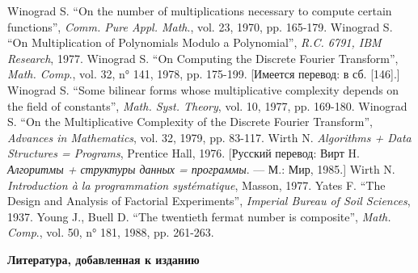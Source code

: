 \documentclass{mai_book}
\begin{document}
{\newpage
\noindent
[176] Winograd S. “On the number of multiplications necessary to compute certain functions”, {\itshape Comm. Pure Appl. Math}., vol. 23, 1970, pp. 165-179.
\newline
[177] Winograd S. “On Multiplication of Polynomials Modulo a Polynomial”, {\itshape R.C. 6791, IBM Research}, 1977.
\newline
[178] Winograd S. “On Computing the Discrete Fourier Transform”, {\itshape Math. Comp}., vol. 32, n° 141, 1978, pp. 175-199. [Имеется перевод: в сб. [146].]
\newline
[179] Winograd S. “Some bilinear forms whose multiplicative complexity depends on the field of constants”, {\itshape Math. Syst. Theory}, vol. 10, 1977, pp. 169-180.
\newline
[180] Winograd S. “On the Multiplicative Complexity of the Discrete Fourier Transform”, {\itshape Advances in Mathematics}, vol. 32, 1979, pp. 83-117.
\newline
[181] Wirth N. {\itshape Algorithms + Data Structures = Programs}, Prentice Hall, 1976. [Русский перевод: Вирт H. {\itshape Алгоритмы + структуры данных = программы}. — М.: Мир, 1985.] \newline
[182] Wirth N. {\itshape Introduction \`{a} la programmation syst\'{e}matique}, Masson, 1977. \newline
[183] Yates F. “The Design and Analysis of Factorial Experiments”, {\itshape Imperial Bureau of Soil Sciences}, 1937.
\newline
[184] Young J., Buell D. “The twentieth fermat number is composite”, {\itshape Math. Comp}., vol. 50, n° 181, 1988, pp. 261-263. \newline

\begin{center}

{\large \textbf{Литература, добавленная к изданию}}

\end{center}

}
\end{document}
